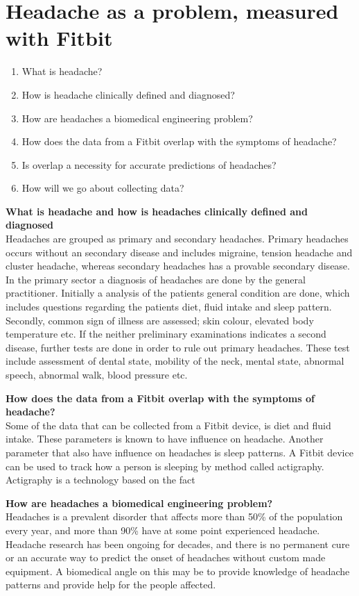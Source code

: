 \section*{Headache as a problem, measured with Fitbit}
\begin{enumerate}
    \item What is headache?
    \item How is headache clinically defined and diagnosed?
    \item How are headaches a biomedical engineering problem?
    \item How does the data from a Fitbit overlap with the symptoms of headache?
    \item Is overlap a necessity for accurate predictions of headaches?
    \item How will we go about collecting data?
\end{enumerate}

\noindent\textbf{What is headache and how is headaches clinically defined and diagnosed}\\
Headaches are grouped as primary and secondary headaches. Primary headaches occurs without an secondary disease and includes migraine, tension headache and cluster headache, whereas secondary headaches has a provable secondary disease. In the primary sector a diagnosis of headaches are done by the general practitioner. Initially a analysis of the patients general condition are done, which includes questions regarding the patients diet, fluid intake and sleep pattern. Secondly, common sign of illness are assessed; skin colour, elevated body temperature etc. If the neither preliminary examinations indicates a second disease, further tests are done in order to rule out primary headaches. These test include assessment of dental state, mobility of the neck, mental state, abnormal speech, abnormal walk, blood pressure etc. \newline

\noindent\textbf{How does the data from a Fitbit overlap with the symptoms of headache?} \\
Some of the data that can be collected from a Fitbit device, is diet and fluid intake. These parameters is known to have influence on headache. Another parameter that also have influence on headaches is sleep patterns. A Fitbit device can be used to track how a person is sleeping by method called actigraphy. Actigraphy is a technology based on the fact
\newline

\noindent\textbf{How are headaches a biomedical engineering problem?} \\
Headaches is a prevalent disorder that affects more than 50\% of the population every year, and more than 90\% have at some point experienced headache. Headache research has been ongoing for decades, and there is no permanent cure or an accurate way to predict the onset of headaches without custom made equipment. A biomedical angle on this may be to provide knowledge of headache patterns and provide help for the people affected. \\

